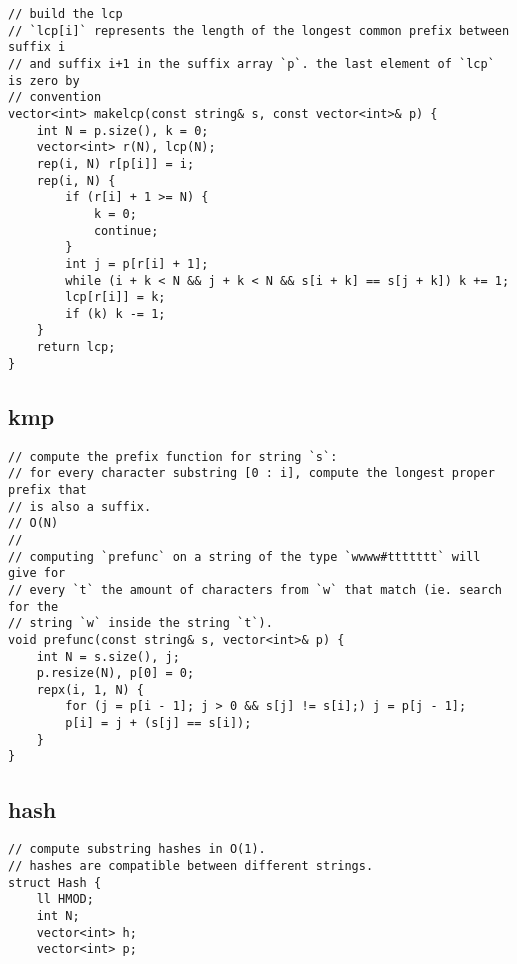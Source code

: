 \documentclass[twoside]{article}
\begin{document}
\begin{multicols*}{2}
\begin{verbatim}
// build the lcp
// `lcp[i]` represents the length of the longest common prefix between suffix i
// and suffix i+1 in the suffix array `p`. the last element of `lcp` is zero by
// convention
vector<int> makelcp(const string& s, const vector<int>& p) {
    int N = p.size(), k = 0;
    vector<int> r(N), lcp(N);
    rep(i, N) r[p[i]] = i;
    rep(i, N) {
        if (r[i] + 1 >= N) {
            k = 0;
            continue;
        }
        int j = p[r[i] + 1];
        while (i + k < N && j + k < N && s[i + k] == s[j + k]) k += 1;
        lcp[r[i]] = k;
        if (k) k -= 1;
    }
    return lcp;
}
\end{verbatim}

{
\subsection*{kmp}
}
\begin{verbatim}
// compute the prefix function for string `s`:
// for every character substring [0 : i], compute the longest proper prefix that
// is also a suffix.
// O(N)
//
// computing `prefunc` on a string of the type `wwww#ttttttt` will give for
// every `t` the amount of characters from `w` that match (ie. search for the
// string `w` inside the string `t`).
void prefunc(const string& s, vector<int>& p) {
    int N = s.size(), j;
    p.resize(N), p[0] = 0;
    repx(i, 1, N) {
        for (j = p[i - 1]; j > 0 && s[j] != s[i];) j = p[j - 1];
        p[i] = j + (s[j] == s[i]);
    }
}

\end{verbatim}

{
\subsection*{hash}
}
\begin{verbatim}
// compute substring hashes in O(1).
// hashes are compatible between different strings.
struct Hash {
    ll HMOD;
    int N;
    vector<int> h;
    vector<int> p;


\end{verbatim}
\end{multicols*}
\end{document}
